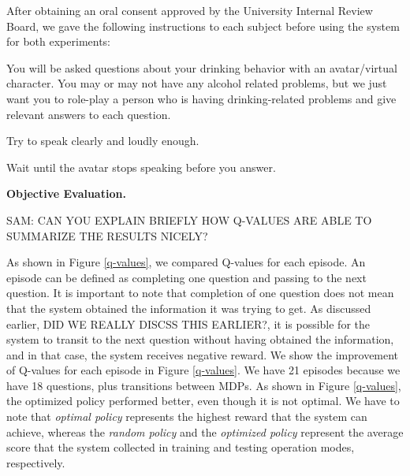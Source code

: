 \documentclass[letterpaper]{article}
\begin{document}
After obtaining an oral consent approved by the University Internal Review Board, we gave the following instructions to each subject before using the system for both experiments:
\vspace{-0 mm}
\begin{compactitem}
\item You will be asked questions about your drinking behavior with an avatar/virtual character.  You may or may not have any alcohol related problems, but we just want you to role-play a person who is having drinking-related problems and give relevant answers to each question.
\vspace{-0 mm}
\item Try to speak clearly and loudly enough.
\vspace{-0 mm}
\item Wait until the avatar stops speaking before you answer.\\
\end{compactitem} 


{\bf Objective Evaluation.}  

SAM: CAN YOU EXPLAIN BRIEFLY HOW Q-VALUES ARE ABLE TO SUMMARIZE THE RESULTS NICELY?

As shown in Figure \ref{q-values}, we compared Q-values for each episode. An episode can be defined as completing one question and passing to the next question. It is important to note that completion of one question does not mean that the system obtained the information it was trying to get. As discussed earlier, DID WE REALLY DISCSS THIS EARLIER?, it is possible for the system to transit to the next question without having obtained the information, and in that case, the system receives negative reward. 
We show the improvement of Q-values for each episode in Figure \ref{q-values}. We have  21 episodes because we have 18 questions, plus transitions between MDPs. As shown in Figure \ref{q-values}, the optimized policy performed better, even though it is not optimal. We have to note that \textit{optimal policy} represents the highest reward that the system can achieve, whereas the \textit{random policy} and the \textit{optimized policy} represent the average score that the system collected in training and testing operation modes, respectively.
\end{document}
